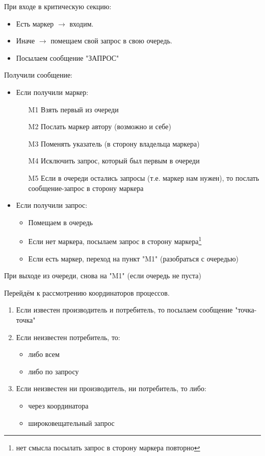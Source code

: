 \documentclass[a4paper,12pt]{article}
\begin{document}
\begin{enumerate}
\begin{enumerate}
			При входе в критическую секцию:
			\begin{itemize}
				\item Есть маркер $\rightarrow$ входим.
				\item Иначе $\rightarrow$ помещаем свой запрос в свою очередь.
				\item Посылаем сообщение "ЗАПРОС"
			\end{itemize}
			Получили сообщение:
			\begin{itemize}
				\item Если получили маркер:
				\begin{itemize}
					\item[M1] Взять первый из очереди
					\item[M2] Послать маркер автору (возможно и себе)
					\item[M3] Поменять указатель (в сторону владельца маркера)
					\item[M4] Исключить запрос, который был первым в очереди
					\item[M5] Если в очереди остались запросы (т.е. маркер нам нужен), 
					то послать сообщение-запрос в сторону маркера
				\end{itemize}
				\item Если получили запрос:
				\begin{itemize}
					\item Помещаем в очередь
					\item Если нет маркера, посылаем запрос в сторону маркера\footnote{
					нет смысла посылать запрос в сторону маркера повторно}
					\item Если есть маркер, переход на пункт "M1" (разобраться с очередью)
				\end{itemize}
			\end{itemize}
			При выходе из очереди, снова на "M1" (если очередь не пуста)		
		\end{enumerate}
	\end{enumerate}
	Перейдём к рассмотрению координаторов процессов.
	\begin{enumerate}
		\item Если известен производитель и потребитель, то посылаем сообщение "точка-точка"
		\item Если неизвестен потребитель, то:
		\begin{itemize}
			\item либо всем
			\item либо по запросу
		\end{itemize}
		\item Если неизвестен ни производитель, ни потребитель, то либо:
		\begin{itemize}
			\item через координатора
			\item широковещательный запрос
		\end{itemize}		
	\end{enumerate}
\end{document}
